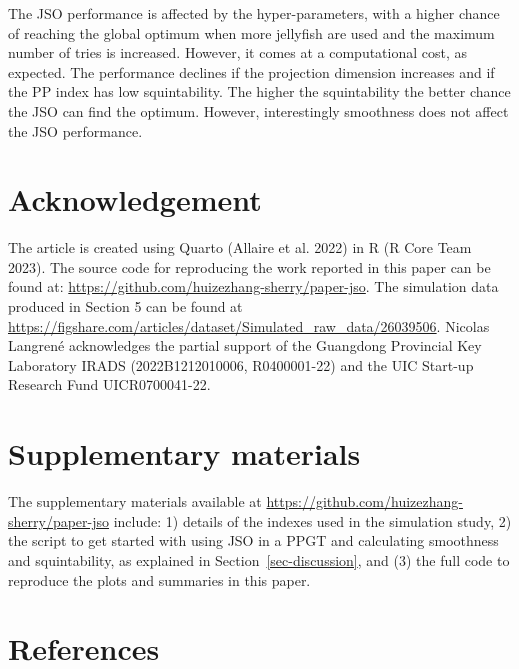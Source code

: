 \documentclass[
  12pt,
]{interact}
\theoremstyle{plain}
\begin{document}
The JSO performance is affected by the hyper-parameters, with a higher
chance of reaching the global optimum when more jellyfish are used and
the maximum number of tries is increased. However, it comes at a
computational cost, as expected. The performance declines if the
projection dimension increases and if the PP index has low
squintability. The higher the squintability the better chance the JSO
can find the optimum. However, interestingly smoothness does not affect
the JSO performance.

\hypertarget{acknowledgement}{%
\section{Acknowledgement}\label{acknowledgement}}

The article is created using Quarto (Allaire et al. 2022) in R (R Core
Team 2023). The source code for reproducing the work reported in this
paper can be found at:
\url{https://github.com/huizezhang-sherry/paper-jso}. The simulation
data produced in Section 5 can be found at
\url{https://figshare.com/articles/dataset/Simulated_raw_data/26039506}.
Nicolas Langrené acknowledges the partial support of the Guangdong
Provincial Key Laboratory IRADS (2022B1212010006, R0400001-22) and the
UIC Start-up Research Fund UICR0700041-22.

\hypertarget{supplementary-materials}{%
\section*{Supplementary materials}\label{supplementary-materials}}

The supplementary materials available at
\url{https://github.com/huizezhang-sherry/paper-jso} include: 1) details
of the indexes used in the simulation study, 2) the script to get
started with using JSO in a PPGT and calculating smoothness and
squintability, as explained in Section~\ref{sec-discussion}, and (3) the
full code to reproduce the plots and summaries in this paper.

\hypertarget{references}{%
\section*{References}\label{references}}
\end{document}
